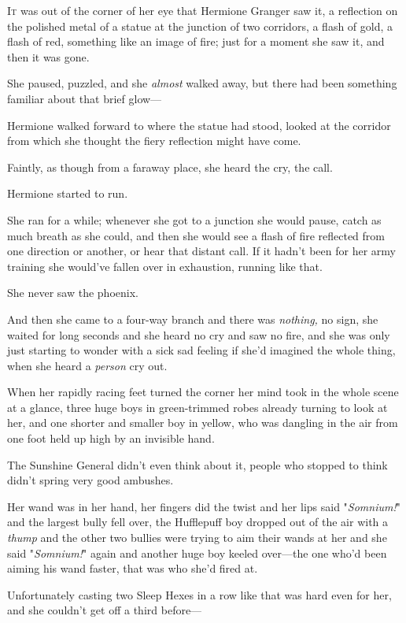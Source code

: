 
\lettrine{I}{t} was out of the
corner of her eye that Hermione Granger saw it, a reflection on the polished
metal of a statue at the junction of two corridors, a flash of gold, a flash of
red, something like an image of fire; just for a moment she saw it, and then it
was gone.

She paused, puzzled, and she \emph{almost} walked away, but there had been
something familiar about that brief glow---

Hermione walked forward to where the statue had stood, looked at the corridor
from which she thought the fiery reflection might have come.

Faintly, as though from a faraway place, she heard the cry, the call.

Hermione started to run.

She ran for a while; whenever she got to a junction she would pause, catch as
much breath as she could, and then she would see a flash of fire reflected from
one direction or another, or hear that distant call. If it hadn't been for her
army training she would've fallen over in exhaustion, running like that.

She never saw the phoenix.

And then she came to a four-way branch and there was \emph{nothing,} no sign,
she waited for long seconds and she heard no cry and saw no fire, and she was
only just starting to wonder with a sick sad feeling if she'd imagined the
whole thing, when she heard a \emph{person} cry out.

When her rapidly racing feet turned the corner her mind took in the whole scene
at a glance, three huge boys in green-trimmed robes already turning to look at
her, and one shorter and smaller boy in yellow, who was dangling in the air
from one foot held up high by an invisible hand.

The Sunshine General didn't even think about it, people who stopped to think
didn't spring very good ambushes.

Her wand was in her hand, her fingers did the twist and her lips said
"\emph{Somnium!}" and the largest bully fell over, the Hufflepuff boy dropped
out of the air with a \emph{thump} and the other two bullies were trying to aim
their wands at her and she said "\emph{Somnium!}" again and another huge boy
keeled over---the one who'd been aiming his wand faster, that was who she'd
fired at.

Unfortunately casting two Sleep Hexes in a row like that was hard even for her,
and she couldn't get off a third before---


